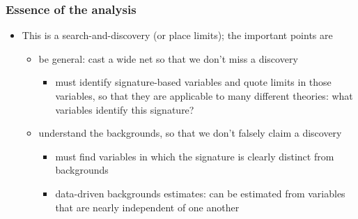 \documentclass[compress]{beamer}
\begin{document}
\begin{frame}
\frametitle{Essence of the analysis}
\begin{itemize}
\item This is a search-and-discovery (or place limits); the important points are
\begin{itemize}
\item be general: cast a wide net so that we don't miss a discovery
\begin{itemize}
\item must identify signature-based variables and quote limits in
  those variables, so that they are applicable to many different
  theories: what variables identify this signature?
\end{itemize}

\item understand the backgrounds, so that we don't falsely claim a discovery
\begin{itemize}
\item must find variables in which the signature is clearly distinct from backgrounds
\item data-driven backgrounds estimates: can be estimated from
  variables that are nearly independent of one another
\end{itemize}
\end{itemize}
\end{itemize}
\end{frame}
\end{document}
